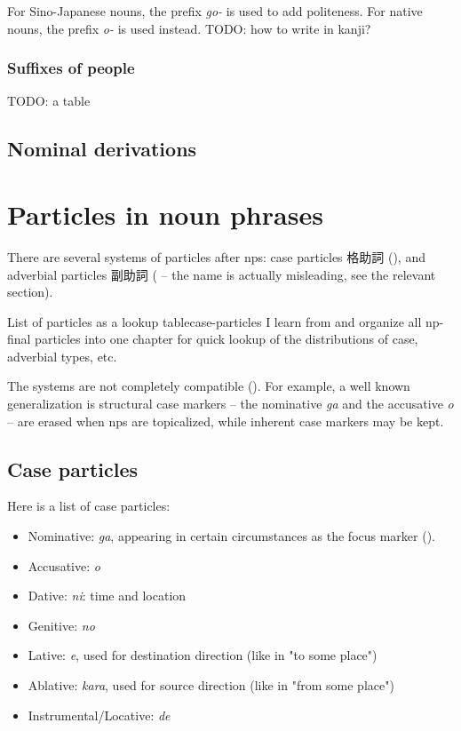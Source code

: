 \documentclass[UTF8, a4paper, oneside, scheme=plain]{ctexrep}
\newcommand{\corpus}[1]{\emph{#1}}
\begin{document}
For Sino-Japanese nouns, the prefix \corpus{go-} is used to add politeness.
For native nouns, the prefix \corpus{o-} is used instead.
TODO: how to write in kanji?

\subsection{Suffixes of people}

TODO: a table

\section{Nominal derivations}

\chapter{Particles in noun phrases}\label{chap:particle-in-np}

There are several systems of particles after \ac{np}s:
case particles 格助詞 (),
and adverbial particles 副助詞 ( 
-- the name is actually misleading, see the relevant section).

\begin{theorybox}{List of particles as a lookup table}{case-particles}
    I learn from \citet{jacques2021grammar} and organize all \ac{np}-final particles into one chapter 
    for quick lookup of the distributions of case, adverbial types, etc.
\end{theorybox}

The systems are not completely compatible ().
For example, a well known generalization is structural case markers 
-- the nominative \corpus{ga} and the accusative \corpus{o} -- 
are erased when \ac{np}s are topicalized,
while inherent case markers may be kept.

\section{Case particles}\label{sec:case-particle}

Here is a list of case particles:
\begin{itemize}
    \item Nominative: \corpus{ga}, 
    appearing in certain circumstances as the focus marker ().
    \item Accusative: \corpus{o}
    \item Dative: \corpus{ni}: time and location 
    \item Genitive: \corpus{no} 
    \item Lative: \corpus{e}, used for destination direction (like in "to some place")
    \item Ablative: \corpus{kara}, used for source direction (like in "from some place")
    \item Instrumental/Locative: \corpus{de}
\end{itemize}
\end{document}
